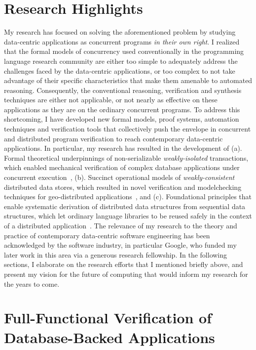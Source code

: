 \section*{Research Highlights}

My research has focused on solving the aforementioned problem by
studying data-centric applications as concurrent programs \emph{in
their own right}. I realized that the formal models of concurrency
used conventionally in the programming language research community are
either too simple to adequately address the challenges faced by the
data-centric applications, or too complex to not take advantage of
their specific characteristics that make them amenable to automated
reasoning. Consequently, the conventional reasoning, verification and
synthesis techniques are either not applicable, or not nearly as
effective on these applications as they are on the ordinary concurrent
programs. To address this shortcoming, I have developed new formal
models, proof systems, automation techniques and verification tools
that collectively push the envelope in concurrent and distributed
program verification to reach contemporary data-centric applications.
In particular, my research has resulted in the development of (a).
Formal theoretical underpinnings of non-serializable
\emph{weakly-isolated} transactions, which enabled mechanical
verification of complex database applications under concurrent
execution~\cite{popl18}, (b).  Succinct operational models of
\emph{weakly-consistent} distributed data stores, which resulted in
novel verification and modelchecking techniques for geo-distributed
applications~\cite{oopsla18}, and (c).  Foundational principles that
enable systematic derivation of distributed data structures from
sequential data structures, which let ordinary language libraries to
be reused safely in the context of a distributed
application~\cite{oopsla19}.  The relevance of my research to the
theory and practice of contemporary data-centric software engineering
has been acknowledged by the software industry, in particular Google,
who funded my later work in this area via a generous research
fellowship. In the following sections, I elaborate on the research
efforts that I mentioned briefly above, and present my vision for the
future of computing that would inform my research for the years to
come.

\section*{Full-Functional Verification of Database-Backed
Applications}

